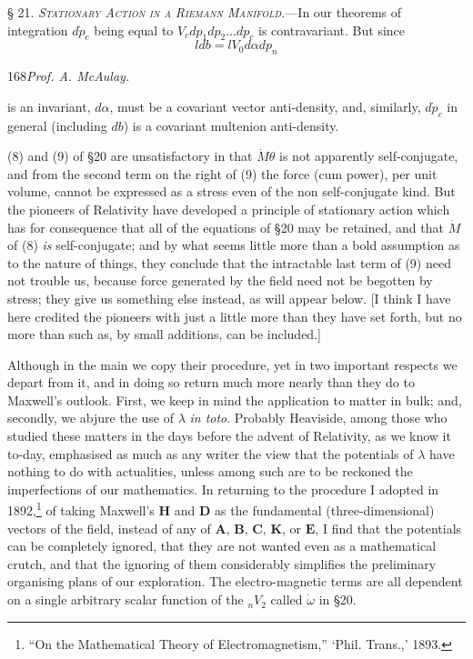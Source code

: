 \documentclass[11pt]{article}
\begin{document}
\noindent\textsc{§ 21. \emph{Stationary Action in a Riemann Manifold.}}---In our theorems of integration $d\dot p_c$ being equal to $V_cd p_1d p_2\ldots d p_c$ is contravariant. But since
\[
  ldb=lV_0d\alpha d p_n
\]

\newpage\thispagestyle{empty}\begin{center}168\hfill \textit{Prof. A. McAulay.}\end{center}
is an invariant, $d\alpha$, must be a covariant vector anti-density, and, similarly, $d\dot p_c$ in general (including $db$) is a covariant multenion anti-density.

\indent (8) and (9) of §20 are unsatisfactory in that $\dot M\theta$ is not apparently self-conjugate, and from the second term on the right of (9) the force (cum power), per unit volume, cannot be expressed as a stress even of the non self-conjugate kind. But the pioneers of Relativity have developed a principle of stationary action which has for consequence that all of the equations of §20 may be retained, and that $\dot M$ of (8) \emph{is} self-conjugate; and by what seems little more than a bold assumption as to the nature of things, they conclude that the intractable last term of (9) need not trouble us, because force generated by the field need not be begotten by stress; they give us something else instead, as will appear below. [I think I have here credited the pioneers with just a little more than they have set forth, but no more than such as, by small additions, can be included.]

\indent Although in the main we copy their procedure, yet in two important respects we depart from it, and in doing so return much more nearly than they do to Maxwell's outlook. First, we keep in mind the application to matter in bulk; and, secondly, we abjure the use of $\lambda$ \emph{in toto}. Probably Heaviside, among those who studied these matters in the days before the advent of Relativity, as we know it to-day, emphasised as much as any writer the view that the potentials of $\lambda$ have nothing to do with actualities, unless among such are to be reckoned the imperfections of our mathematics. In returning to the procedure I adopted in 1892,\footnote{``On the Mathematical Theory of Electromagnetism,'' `Phil. Trans.,' 1893.} of taking Maxwell's $\mathbf{H}$ and $\mathbf{D}$ as the fundamental (three-dimensional) vectors of the field, instead of any of $\mathbf{A}$, $\mathbf{B}$, $\mathbf{C}$, $\mathbf{K}$, or $\mathbf{E}$, I find that the potentials can be completely ignored, that they are not wanted even as a mathematical crutch, and that the ignoring of them considerably simplifies the preliminary organising plans of our exploration. The electro-magnetic terms are all dependent on a single arbitrary scalar function of the ${}_nV_2$ called $\dot\omega$ in §20.
\end{document}
